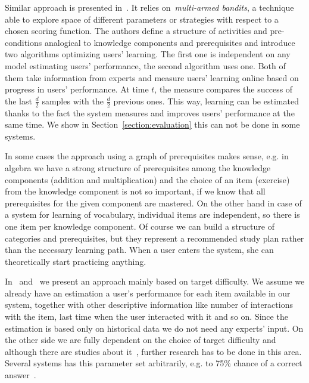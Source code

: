 \documentclass[table,color,cover,twoside,nolot,nolof]{fithesis3/fithesis3}
\begin{document}
Similar approach is presented in~\cite{lopes2015multi}. It relies
on~\emph{multi-armed bandits}, a technique able to explore
space of different parameters or strategies with respect to a chosen scoring
function. The authors define a structure of activities and pre-conditions
analogical to knowledge components and prerequisites and introduce two
algorithms optimizing users' learning. The first one is independent on any
model estimating users' performance, the second algorithm uses one. Both of
them take information from experts and measure users' learning online based on
progress in users' performance. At time $t$, the measure compares the success
of the last $\frac{d}{2}$ samples with the $\frac{d}{2}$ previous ones. This
way, learning can be estimated thanks to the fact the system measures and
improves users' performance at the same time. We show in
Section~\ref{section:evaluation} this can not be done in some systems.

In some cases the approach using a graph of prerequisites makes sense, e.g.
in algebra we have a strong structure of prerequisites among the knowledge
components (addition and multiplication) and the choice of an item (exercise)
from the knowledge component is not so important, if we know that all
prerequisites for the given component are mastered. On the other hand in case
of a system for learning of vocabulary, individual items are independent, so there is
one item per knowledge component. Of course we can build a structure of
categories and prerequisites, but they represent a recommended study plan
rather than the necessary learning path. When a user enters the system, she can
theoretically start practicing anything.

In~\cite{papousek2014adaptive} and~\cite{papousek2015impact} we present an
approach mainly based on target difficulty. We assume we already have an
estimation a user's performance for each item available in our system,
together with other descriptive information like number of interactions with
the item, last time when the user interacted with it and so on. Since the
estimation is based only on historical data we do not need any experts' input.
On the other side we are fully dependent on the choice of target difficulty and
although there are studies about it~\cite{lomas2013optimizing,
lomas2014optimizing,jansen2013influence,papousek2015impact}, further research
has to be done in this area. Several systems has this parameter set
arbitrarily, e.g. to 75\% chance of a correct
answer~\cite{klinkenberg2011computer}.
\end{document}
